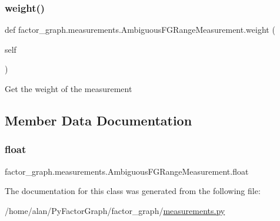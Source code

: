 \subsubsection{\texorpdfstring{weight()}{weight()}}
{\footnotesize\ttfamily def factor\+\_\+graph.\+measurements.\+Ambiguous\+F\+G\+Range\+Measurement.\+weight (\begin{DoxyParamCaption}\item[{}]{self }\end{DoxyParamCaption})}

\begin{DoxyVerb}Get the weight of the measurement
\end{DoxyVerb}


\subsection{Member Data Documentation}
\mbox{\label{classfactor__graph_1_1measurements_1_1AmbiguousFGRangeMeasurement_ad3644bfd743c770a2e54b621b8c86b08}}
\subsubsection{\texorpdfstring{float}{float}}
{\footnotesize\ttfamily factor\+\_\+graph.\+measurements.\+Ambiguous\+F\+G\+Range\+Measurement.\+float\hspace{0.3cm}{\ttfamily [static]}}



The documentation for this class was generated from the following file\+:\begin{DoxyCompactItemize}
\item
/home/alan/\+Py\+Factor\+Graph/factor\+\_\+graph/\hyperlink{measurements_8py}{measurements.\+py}\end{DoxyCompactItemize}
